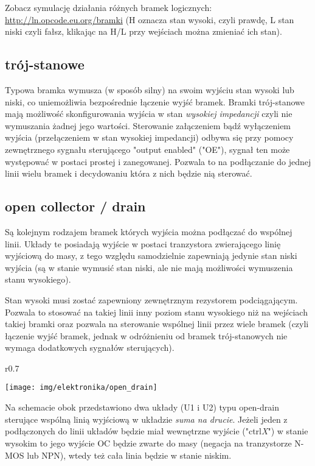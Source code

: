 Zobacz symulację działania różnych bramek logicznych: \url{http://ln.opcode.eu.org/bramki} (H oznacza stan wysoki, czyli prawdę, L stan niski czyli fałsz, klikając na H/L przy wejściach można zmieniać ich stan).

\subsection{trój-stanowe}
Typowa bramka wymusza (w sposób silny) na swoim wyjściu stan wysoki lub niski, co uniemożliwia bezpośrednie łączenie wyjść bramek.
Bramki trój-stanowe mają możliwość skonfigurowania wyjścia w stan \emph{wysokiej impedancji} czyli nie wymuszania żadnej jego wartości.
Sterowanie załączeniem bądź wyłączeniem wyjścia (przełączeniem w stan wysokiej impedancji) odbywa się przy pomocy zewnętrznego sygnału sterującego "output enabled" ("OE"), sygnał ten może występować w postaci prostej i zanegowanej.
Pozwala to na podłączanie do jednej linii wielu bramek i decydowaniu która z nich będzie nią sterować.

\subsection{open collector / drain}
Są kolejnym rodzajem bramek których wyjścia można podłączać do wspólnej linii. Układy te posiadają wyjście w postaci tranzystora zwierającego linię wyjściową do masy, z tego względu samodzielnie zapewniają jedynie stan niski wyjścia (są w stanie wymusić stan niski, ale nie mają możliwości wymuszenia stanu wysokiego).

Stan wysoki musi zostać zapewniony zewnętrznym rezystorem podciągającym. Pozwala to stosować na takiej linii inny poziom stanu wysokiego niż na wejściach takiej bramki oraz pozwala na sterowanie wspólnej linii przez wiele bramek (czyli łączenie wyjść bramek, jednak w odróżnieniu od bramek trój-stanowych nie wymaga dodatkowych sygnałów sterujących).

\begin{wrapfigure}{r}{0.7\textwidth}
  \begin{center}
    \vspace{-20pt}
    \texttt{[image: img/elektronika/open\_drain]}
    \vspace{-20pt}
  \end{center}
\end{wrapfigure}
Na schemacie obok przedstawiono dwa układy (U1 i U2) typu open-drain sterujące wspólną linią wyjściową w układzie \emph{suma na drucie}. Jeżeli jeden z podłączonych do linii układów będzie miał wewnętrzne wyjście ("ctrl\textit{X}") w stanie wysokim to jego wyjście OC będzie zwarte do masy (negacja na tranzystorze N-MOS lub NPN), wtedy też cała linia będzie w stanie niskim.

